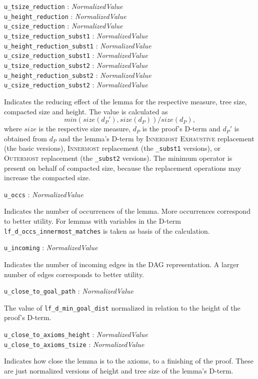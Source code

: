 \documentclass[a4paper,11pt]{article}
\newcommand{\f}[1]{\texttt{#1}}
\newcommand{\m}[1]{\mathit{#1}}
\newcommand{\lit}[1]{\textnormal{\textit{#1}}}
\newcommand{\propsig}[2]
{\noindent \f{#1} : #2}
\newcommand{\propdesc}[1]
{\par \hspace*{\fill}\begin{minipage}{0.9\textwidth}#1\end{minipage}\par\smallskip}
\begin{document}
\propsig{u\_tsize\_reduction}{\lit{NormalizedValue}}\\
\propsig{u\_height\_reduction}{\lit{NormalizedValue}}\\
\propsig{u\_csize\_reduction}{\lit{NormalizedValue}}\\
\propsig{u\_tsize\_reduction\_subst1}{\lit{NormalizedValue}}\\
\propsig{u\_height\_reduction\_subst1}{\lit{NormalizedValue}}\\
\propsig{u\_csize\_reduction\_subst1}{\lit{NormalizedValue}}\\
 \propsig{u\_tsize\_reduction\_subst2}{\lit{NormalizedValue}}\\
\propsig{u\_height\_reduction\_subst2}{\lit{NormalizedValue}}\\
\propsig{u\_csize\_reduction\_subst2}{\lit{NormalizedValue}}
\propdesc{Indicates the reducing effect of the lemma for the respective
  measure, tree size, compacted size and height. The value is calculated as
  \[\m{min}(\m{size}(d_P'), \m{size}(d_P)) / \m{size}(d_P),\]
  where $\m{size}$ is the respective size measure, $d_P$ is the proof's D-term
  and $d_P'$ is obtained from $d_P$ and the lemma's D-term by
  \textsc{Innermost Exhaustive} replacement (the basic versions),
  \textsc{Innermost} replacement (the \f{\_subst1} versions), or
  \textsc{Outermost} replacement (the \f{\_subst2} versions). The minimum
  operator is present on behalf of compacted size, because the replacement
  operations may increase the compacted size.}

\propsig{u\_occs}{\lit{NormalizedValue}} \propdesc{Indicates the number of
  occurrences of the lemma. More occurrences correspond to better utility. For
  lemmas with variables in the D-term \f{lf\_d\_occs\_innermost\_matches} is
  taken as basis of the calculation.}

\propsig{u\_incoming}{\lit{NormalizedValue}}
\propdesc{Indicates the number of incoming edges in the DAG representation.
  A larger number of edges corresponds to better utility.}

\propsig{u\_close\_to\_goal\_path}{\lit{NormalizedValue}} \propdesc{The value
  of \f{lf\_d\_min\_goal\_dist} normalized in relation to the height of the
  proof's D-term.}

\propsig{u\_close\_to\_axioms\_height}{\lit{NormalizedValue}}\\
\propsig{u\_close\_to\_axioms\_tsize}{\lit{NormalizedValue}}
\propdesc{Indicates how close the lemma is to the axioms, to a finishing of
  the proof. These are just normalized versions of height and tree size of
  the lemma's D-term.}
\end{document}
